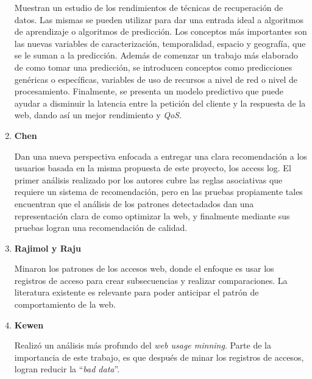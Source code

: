 \begin{enumerate}
	{  
  Muestran un estudio de los rendimientos de técnicas de recuperación de datos.
  Las mismas se pueden utilizar para dar una entrada ideal a algoritmos de aprendizaje o algoritmos de predicción. 
  Los conceptos más importantes son las nuevas variables de caracterización, temporalidad, espacio y geografía, que se le suman a la predicción. 
  Además de comenzar un trabajo más elaborado de como tomar una predicción, se introducen conceptos como predicciones genéricas o específicas, variables de uso de recursos a nivel de red o nivel de procesamiento.
  Finalmente, se presenta un modelo predictivo que puede ayudar a disminuir la latencia entre la petición del cliente y la respuesta de la web, dando así un mejor rendimiento y \emph{QoS}.
  
 }


  \item \textbf{Chen \etal~\cite{Chen2011}} 
  
	{  
	Dan una nueva perspectiva enfocada a entregar una clara recomendación a los usuarios basada en la misma propuesta de este proyecto, los access log.
	El primer análisis realizado por los autores cubre las reglas asociativas que requiere un sistema de recomendación, pero en las pruebas propiamente tales encuentran que el análisis de los patrones detectadados dan una representación clara de como optimizar la web, y finalmente mediante sus pruebas logran una recomendación de calidad.}
  \item \textbf{Rajimol y Raju~\cite{Rajimol2012} }
	{  
	Minaron los patrones de los accesos web, donde el enfoque es usar los registros de acceso para crear subsecuencias y realizar comparaciones.
	La literatura existente es relevante para poder anticipar el patrón de comportamiento de la web.


	}
  \item \textbf{Kewen~\cite{kewen2012} }
  
	{  
	Realizó un análisis más profundo del \emph{web usage minning}.
	Parte de la importancia de este trabajo, es que después de minar los registros de accesos, logran reducir la ``\emph{bad data}''.
	}


\end{enumerate}
